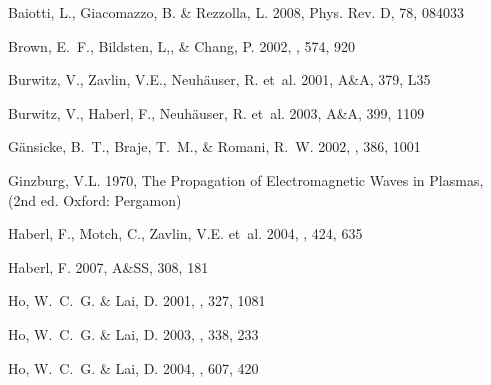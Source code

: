 \documentclass{aa}
\begin{document}
 
 
 
 
% 
\begin{thebibliography}{} 
 
Baiotti, L., Giacomazzo, B. \& Rezzolla, L. 2008, 
Phys. Rev. D, 78, 084033 
 
{Brown}, E.~F., {Bildsten}, L,, \& {Chang}, P. 2002, 
\apj, 574, 920 
 
 {Burwitz}, V., {Zavlin}, V.E., {Neuh\"auser}, R. et~al. 
2001, A\&A, 379, L35 
 
 {Burwitz}, V., {Haberl}, F., {Neuh\"auser}, R. et~al. 
2003, A\&A, 399, 1109 
 
 
 
{G\"ansicke}, B.~T., {Braje}, T.~M., \& {Romani}, R.~W. 2002, \aap, 386, 1001 
 
{Ginzburg}, V.L. 1970, {The Propagation of Electromagnetic Waves in Plasmas}, 
(2nd ed. Oxford: Pergamon) 
 
{Haberl}, F., {Motch}, C., {Zavlin}, V.E. {et~al.} 2004, \aap, 424, 635 
 
{Haberl}, F. 2007, A\&SS, 308, 181 
 
{Ho}, W.~C.~G. \& {Lai}, D. 2001, \mnras, 327, 1081 
 
{Ho}, W.~C.~G. \& {Lai}, D. 2003, \mnras, 338, 233 
 
{Ho}, W.~C.~G. \& {Lai}, D. 2004, \apj, 607, 420 
 

\end{thebibliography}
\end{document}
